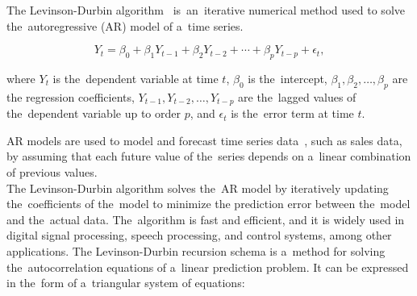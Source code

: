 The Levinson-Durbin algorithm~\cite{Levinson} is~an~iterative numerical method used to solve the~autoregressive
(AR) model of a~time series.

\begin{equation}
    \label{eq:levinson}
    Y_t = \beta_0 + \beta_1 Y_{t-1} + \beta_2 Y_{t-2} + \cdots + \beta_p Y_{t-p} + \epsilon_t,
\end{equation}

where $Y_t$ is the~dependent variable at time $t$, $\beta_0$ is the~intercept, $\beta_1, \beta_2, \dots, \beta_p$ are the
regression coefficients, $Y_{t-1}, Y_{t-2}, \dots, Y_{t-p}$ are the~lagged values of the~dependent variable up to
order $p$, and $\epsilon_t$ is the~error term at time $t$.

AR models are used to model and forecast time series data~\cite{Durbin}, such as sales data, by assuming that each
future value of the~series depends on a~linear combination of previous values.
\\
The Levinson-Durbin algorithm solves the~AR model by iteratively updating the~coefficients of the~model to minimize
the prediction error between the~model and the~actual data. The~algorithm is fast and efficient, and it is widely
used in digital signal processing, speech processing, and control systems, among other applications.
The Levinson-Durbin recursion schema is a~method for solving the~autocorrelation equations of a~linear
prediction problem. It can be expressed in the~form of a~triangular system of equations:

